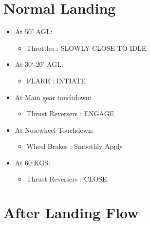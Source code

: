 \section{Normal Landing}
\label{normallanding}

\begin{itemize}
\item At 50' AGL:

\begin{itemize}
\item Throttles : SLOWLY CLOSE TO IDLE

\end{itemize}

\item At 30`-20' AGL:

\begin{itemize}
\item FLARE : INTIATE

\end{itemize}

\item At Main gear touchdown:

\begin{itemize}
\item Thrust Reversers : ENGAGE

\end{itemize}

\item At Nosewheel Touchdown:

\begin{itemize}
\item Wheel Brakes : Smoothly Apply

\end{itemize}

\item At 60 KGS:

\begin{itemize}
\item Thrust Reversers : CLOSE

\end{itemize}

\end{itemize}

\newpage

\section{After Landing Flow}
\label{afterlandingflow}

